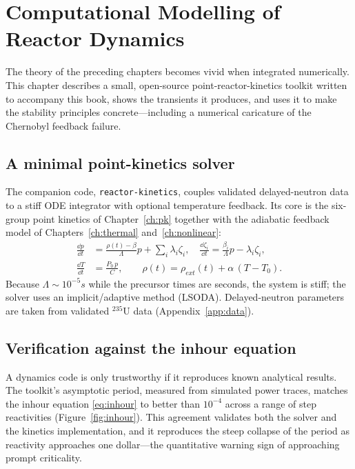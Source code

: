 \chapter{Computational Modelling of Reactor Dynamics}
\label{ch:comp}

The theory of the preceding chapters becomes vivid when integrated numerically.
This chapter describes a small, open-source point-reactor-kinetics toolkit written
to accompany this book, shows the transients it produces, and uses it to make the
stability principles concrete---including a numerical caricature of the Chernobyl
feedback failure.

\section{A minimal point-kinetics solver}

The companion code, \texttt{reactor-kinetics}, couples validated delayed-neutron
data to a stiff ODE integrator with optional temperature feedback. Its core is the
six-group point kinetics of Chapter~\ref{ch:pk} together with the adiabatic
feedback model of Chapters~\ref{ch:thermal} and~\ref{ch:nonlinear}:
\begin{align*}
\frac{\dd p}{\dd t} &= \frac{\rho(t)-\beta}{\Lambda}p + \sum_i\lambda_i\zeta_i,\quad
\frac{\dd \zeta_i}{\dd t} = \frac{\beta_i}{\Lambda}p - \lambda_i\zeta_i,\\
\frac{\dd T}{\dd t} &= \frac{P_0\,p}{C},\qquad
\rho(t) = \rho_{ext}(t) + \alpha\,(T-T_0).
\end{align*}
Because $\Lambda\sim 10^{-5}\unit{s}$ while the precursor times are seconds, the
system is stiff; the solver uses an implicit/adaptive method (LSODA). Delayed-neutron
parameters are taken from validated $^{235}$U data (Appendix~\ref{app:data}).

\section{Verification against the inhour equation}

A dynamics code is only trustworthy if it reproduces known analytical results. The
toolkit's asymptotic period, measured from simulated power traces, matches the
inhour equation \eqref{eq:inhour} to better than $10^{-4}$ across a range of step
reactivities (Figure~\ref{fig:inhour}). This agreement validates both the solver
and the kinetics implementation, and it reproduces the steep collapse of the period
as reactivity approaches one dollar---the quantitative warning sign of approaching
prompt criticality.

